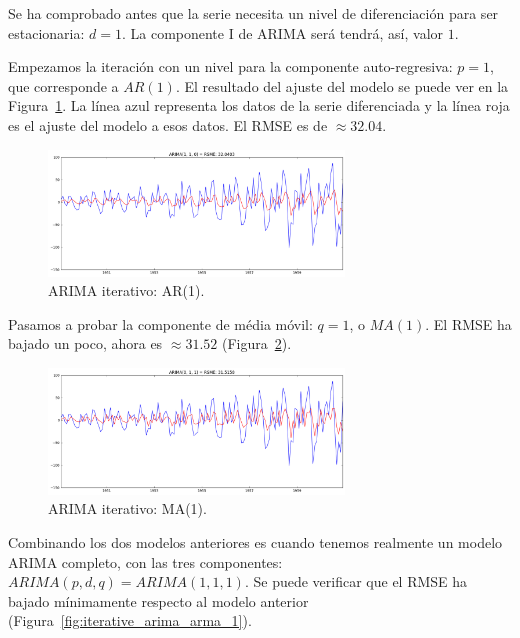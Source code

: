 \documentclass[11pt,spanish,listoffigures,listoftables]{tfgetsinf}
\begin{document}
    Se ha comprobado antes que la serie necesita un nivel de diferenciación para ser estacionaria: \(d=1\). La componente I de ARIMA será tendrá, así, valor \(1\). 
    
    Empezamos la iteración con un nivel para la componente auto-regresiva: \(p=1\), que corresponde a \(AR(1)\). El resultado del ajuste del modelo se puede ver en la Figura~\ref{fig:iterative_arima_ar_1}. La línea azul representa los datos de la serie diferenciada y la línea roja es el ajuste del modelo a esos datos. El RMSE es de \(\approx32.04\). 
    
    \begin{figure}[h]
        \centering
        \includegraphics[width=0.7\textwidth]{arima_110.png}
        \caption{ARIMA iterativo: AR(1).}
        \label{fig:iterative_arima_ar_1}
    \end{figure}
    
    Pasamos a probar la componente de média móvil: \(q=1\), o \(MA(1)\). El RMSE ha bajado un poco, ahora es \(\approx31.52\) (Figura~\ref{fig:iterative_arima_ma_1}).
    
    \begin{figure}[h]
        \centering
        \includegraphics[width=0.7\textwidth]{arima_011.png}
        \caption{ARIMA iterativo: MA(1).}
        \label{fig:iterative_arima_ma_1}
    \end{figure}
    
    Combinando los dos modelos anteriores es cuando tenemos realmente un modelo ARIMA completo, con las tres componentes: \(ARIMA(p, d, q)=ARIMA(1, 1, 1)\). Se puede verificar que el RMSE ha bajado mínimamente respecto al modelo anterior (Figura~\ref{fig:iterative_arima_arma_1}).
    
\end{document}
